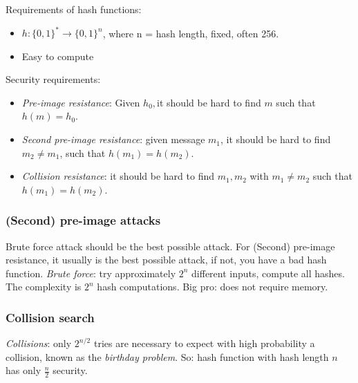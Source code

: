\documentclass[language=english,number=]{homework}
\begin{document}
    Requirements of hash functions:
    \begin{itemize}
        \item $h: \{0,1\}^* \to \{ 0,1 \}^n$, where n = hash length, fixed, often 256.
        \item Easy to compute
    \end{itemize}

    Security requirements:
    \begin{itemize}
        \item \textit{Pre-image resistance}: Given $h_0, $it should be hard to find $m$ such that $h(m) = h_0$.
        \item \textit{Second pre-image resistance}: given message $m_1$, it should be hard to find $m_2 \ne m_1$, such that $h(m_1) = h(m_2)$.
        \item \textit{Collision resistance}: it should be hard to find $m_1, m_2$ with $m_1 \ne m_2$ such that $h(m_1) = h(m_2)$.
    \end{itemize}

    \subsubsection{(Second) pre-image attacks}

    Brute force attack should be the best possible attack.
For (Second) pre-image resistance, it usually is the best possible attack, if not, you have a bad hash function.
    \textit{Brute force}: try approximately $2^n$ different inputs, compute all hashes.
    The complexity is $2^n$ hash computations.
    Big pro: does not require memory.

    \subsubsection{Collision search}

    \textit{Collisions}: only $2^{n/2}$ tries are necessary to expect with high probability a collision, known as the \textit{birthday problem}.
    So: hash function with hash length $n$ has only $\frac{n}{2}$ security.
\end{document}
